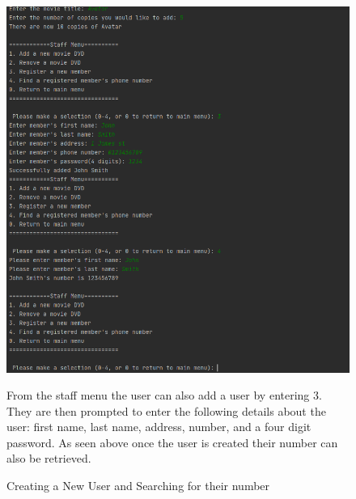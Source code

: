 \documentclass[a4paper,12pt]{article}
\begin{document}
\begin{figure}[!htb]
\centering
\includegraphics[width=1\textwidth]{4}
\caption{Creating a New User and Searching for their number}
\medskip
\small
From the staff menu the user can also add a user by entering 3. They are then prompted to enter the following details about the user: first name, last name, address, number, and a four digit password. As seen above once the user is created their number can also be retrieved.
\end{figure}
\end{document}

